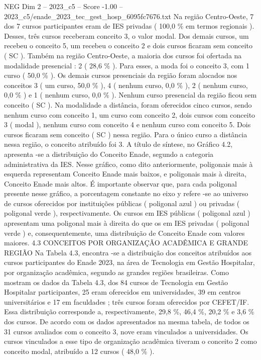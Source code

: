 \begin{textsample}{NEG Dim 2 – 2023\_c5 – Score -1.00 – 2023\_c5/enade\_2023\_tec\_gest\_hosp\_6095fc7676.txt}
Na região Centro-Oeste, 7 dos 7 cursos participantes eram de IES privadas ( 100,0 \% em termos regionais ).
Desses, três cursos receberam conceito 3, o valor modal.
Dos demais cursos, um recebeu o conceito 5, um recebeu o conceito 2 e dois cursos ficaram sem conceito ( SC ).
Também na região Centro-Oeste, a maioria dos cursos foi ofertada na modalidade presencial : 2 ( 28,6 \% ).
Para esses, a moda foi o conceito 3, com 1 curso ( 50,0 \% ).
Os demais cursos presenciais da região foram alocados nos conceitos 3 ( um curso, 50,0 \% ), 4 ( nenhum curso, 0,0 \% ), 2 ( nenhum curso, 0,0 \% ) e 1 ( nenhum curso, 0,0 \% ).
Nenhum curso presencial da região ficou sem conceito ( SC ).
Na modalidade a distância, foram oferecidos cinco cursos, sendo nenhum curso com conceito 1, um curso com conceito 2, dois cursos com conceito 3 ( modal ), nenhum curso com conceito 4 e nenhum curso com conceito 5.
Dois cursos ficaram sem conceito ( SC ) nessa região.
Para o único curso a distância nessa região, o conceito atribuído foi 3.
A título de síntese, no Gráfico 4.2, apresenta -se a distribuição do Conceito Enade, segundo a categoria administrativa da IES.
Nesse gráfico, como dito anteriormente, poligonais mais à esquerda representam Conceito Enade mais baixos, e poligonais mais à direita, Conceito Enade mais altos.
É importante observar que, para cada poligonal presente nesse gráfico, a porcentagem constante no eixo y refere -se ao universo de cursos oferecidos por instituições públicas ( poligonal azul ) ou privadas ( poligonal verde ), respectivamente.
Os cursos em IES públicas ( poligonal azul ) apresentam uma poligonal mais à direita do que os em IES privadas ( poligonal verde ) e, consequentemente, uma distribuição de Conceito Enade com valores maiores. 4.3 CONCEITOS POR ORGANIZAÇÃO ACADÊMICA E GRANDE REGIÃO Na Tabela 4.3, encontra -se a distribuição dos conceitos atribuídos aos cursos participantes do Enade 2023, na área de Tecnologia em Gestão Hospitalar, por organização acadêmica, segundo as grandes regiões brasileiras.
Como mostram os dados da Tabela 4.3, dos 84 cursos de Tecnologia em Gestão Hospitalar participantes, 25 eram oferecidos em universidades, 39 em centros universitários e 17 em faculdades ; três cursos foram oferecidos por CEFET/IF.
Essa distribuição corresponde a, respectivamente, 29,8 \%, 46,4 \%, 20,2 \% e 3,6 \% dos cursos.
De acordo com os dados apresentados na mesma tabela, de todos os 31 cursos avaliados com o conceito 3, nove eram vinculados a universidades.
Os cursos vinculados a esse tipo de organização acadêmica tiveram o conceito 2 como conceito modal, atribuído a 12 cursos ( 48,0 \% ).

\end{textsample}
